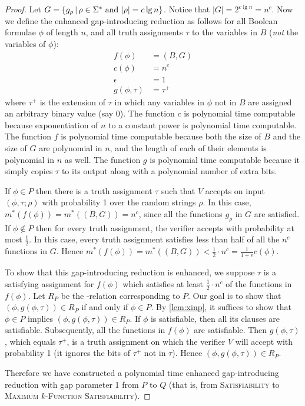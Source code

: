 \documentclass[]{article}
\theoremstyle{plain}
\theoremstyle{definition}
\begin{document}
\begin{proof}
  Let $G = \left\{g_\rho \,\middle|\, \rho \in \Sigma^* \textnormal{ and } |\rho| = c \lg n \right\}$.
  Notice that $|G| = 2^{c \lg n} = n^c$.
  Now we define the enhanced gap-introducing reduction as follows for all Boolean formulae $\phi$ of length $n$, and all truth assignments $\tau$ to the variables in $B$ (\emph{not} the variables of $\phi$):
  \begin{align*}
    f(\phi) & = (B, G) \\
    c(\phi) & = n^c \\
    \epsilon & = 1 \\
    g(\phi, \tau) & = \tau^+
  \end{align*}
  where $\tau^+$ is the extension of $\tau$ in which any variables in $\phi$ not in $B$ are assigned an arbitrary binary value (say 0).
  The function $c$ is polynomial time computable because exponentiation of $n$ to a constant power is polynomial time computable.
  The function $f$ is polynomial time computable because both the size of $B$ and the size of $G$ are polynomial in $n$, and the length of each of their elements is polynomial in $n$ as well.
  The function $g$ is polynomial time computable because it simply copies $\tau$ to its output along with a polynomial number of extra bits.

  If $\phi \in P$ then there is a truth assignment $\tau$ such that $V$ accepts on input $(\phi, \tau; \rho)$ with probability 1 over the random strings $\rho$.
  In this case, $m^*(f(\phi)) = m^*((B, G)) = n^c$, since all the functions $g_\rho$ in $G$ are satisfied.
  If $\phi \notin P$ then for every truth assignment, the verifier accepts with probability at most $\frac{1}{2}$.
  In this case, every truth assignment satisfies less than half of all the $n^c$ functions in $G$.
  Hence $m^*(f(\phi)) = m^*((B, G)) < \frac{1}{2} \cdot n^c = \frac{1}{1 + \epsilon} c(\phi)$.
  
  To show that this gap-introducing reduction is enhanced, we suppose $\tau$ is a satisfying assignment for $f(\phi)$ which satisfies at least $\frac{1}{2} \cdot n^c$ of the functions in $f(\phi)$.
  Let $R_P$ be the \NP-relation corresponding to $P$.
  Our goal is to show that $(\phi, g(\phi, \tau)) \in R_P$ if and only if $\phi \in P$.
  By \autoref{lem:xinp}, it suffices to show that $\phi \in P$ implies $(\phi, g(\phi, \tau)) \in R_P$.
  If $\phi$ is satisfiable, then all its clauses are satisfiable.
  Subsequently, all the functions in $f(\phi)$ are satisfiable.
  Then $g(\phi, \tau)$, which equals $\tau^+$, is a truth assignment on which the verifier $V$ will accept with probability 1 (it ignores the bits of $\tau^+$ not in $\tau$).
  Hence $(\phi, g(\phi, \tau)) \in R_P$.

  Therefore we have constructed a polynomial time enhanced gap-introducing reduction with gap parameter 1 from $P$ to $Q$ (that is, from \textsc{Satisfiability} to \textsc{Maximum $k$-Function Satisfiability}).
\end{proof}
\end{document}
